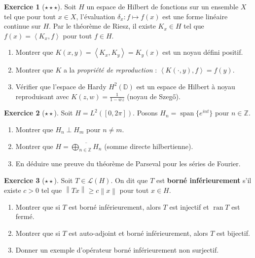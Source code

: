 \documentclass[a4paper,12pt]{book}
\DeclareMathOperator{\spn}{span}
\DeclareMathOperator{\ran}{ran}
\newcommand{\Z}{\mathbb{Z}}
\newcommand{\norm}[1]{\left\| #1 \right\|}
\newcommand{\inner}[2]{\left\langle #1, #2 \right\rangle}
\theoremstyle{definition}
\newtheorem{exercice}{Exercice}[chapter]
\theoremstyle{plain}
\theoremstyle{remark}
\begin{document}
\begin{exercice}[$\star\star\star$]\label{exo:ch2-noyau-reproduisant}
Soit $H$ un espace de Hilbert de fonctions sur un ensemble $X$ tel que pour tout $x \in X$, l'évaluation $\delta_x : f \mapsto f(x)$ est une forme linéaire continue sur $H$. Par le théorème de Riesz, il existe $K_x \in H$ tel que $f(x) = \inner{K_x}{f}$ pour tout $f \in H$.
\begin{enumerate}[label=(\alph*)]
    \item Montrer que $K(x,y) = \inner{K_x}{K_y} = K_y(x)$ est un noyau défini positif.
    \item Montrer que $K$ a la \emph{propriété de reproduction} : $\inner{K(\cdot, y)}{f} = f(y)$.
    \item Vérifier que l'espace de Hardy $H^2(\mathbb{D})$ est un espace de Hilbert à noyau reproduisant avec $K(z,w) = \frac{1}{1-\overline{w}z}$ (noyau de Szeg\H{o}).
\end{enumerate}
\end{exercice}

\begin{exercice}[$\star\star$]\label{exo:ch2-somme-directe}
Soit $H = L^2([0,2\pi])$. Posons $H_n = \spn\{e^{int}\}$ pour $n \in \Z$.
\begin{enumerate}[label=(\alph*)]
    \item Montrer que $H_n \perp H_m$ pour $n \neq m$.
    \item Montrer que $H = \overline{\bigoplus_{n \in \Z} H_n}$ (somme directe hilbertienne).
    \item En déduire une preuve du théorème de Parseval pour les séries de Fourier.
\end{enumerate}
\end{exercice}

\begin{exercice}[$\star\star$]\label{exo:ch2-operateurs-borneinf}
Soit $T \in \mathcal{L}(H)$. On dit que $T$ est \textbf{borné inférieurement} s'il existe $c > 0$ tel que $\norm{Tx} \geq c\norm{x}$ pour tout $x \in H$.
\begin{enumerate}[label=(\alph*)]
    \item Montrer que si $T$ est borné inférieurement, alors $T$ est injectif et $\ran T$ est fermé.
    \item Montrer que si $T$ est auto-adjoint et borné inférieurement, alors $T$ est bijectif.
    \item Donner un exemple d'opérateur borné inférieurement non surjectif.
\end{enumerate}
\end{exercice}
\end{document}
